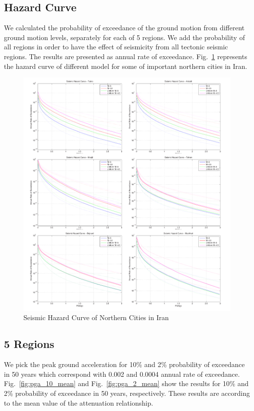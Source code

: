 \subsection{Hazard Curve}
We calculated the probability of exceedance of the ground motion from different ground motion levels, separately for each of 5 regions. We add the probability of all regions in order to have the effect of seismicity from all tectonic seismic regions. The results are presented as annual rate of exceedance. Fig.~\ref{fig:hazardcurve} represents the hazard curve of different model for some of important northern cities in Iran. 

\begin{figure} [!ht]
\centering
\includegraphics[scale=0.4]{figures/pdf/HazardCurve.pdf} 
\caption{Seismic Hazard Curve of Northern Cities in Iran}
\label{fig:hazardcurve}
\end{figure}



\subsection{5 Regions}
We pick the peak ground acceleration for 10\% and 2\% probability of exceedance in 50 years which correspond with 0.002 and 0.0004 annual rate of exceedance. 
Fig.~\ref{fig:pga_10_mean} and Fig.~\ref{fig:pga_2_mean} show the results for 10\% and 2\% probability of exceedance in 50 years, respectively. These results are according to the mean value of the attenuation relationship.

